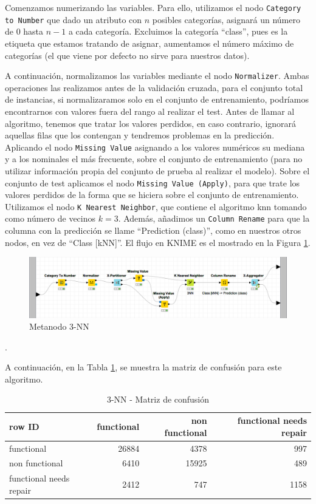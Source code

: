 \documentclass[a4paper, 20pt]{article}
\begin{document}
Comenzamos numerizando las variables. Para ello, utilizamos el nodo \texttt{Category to Number} que dado un atributo con $n$ posibles categorías, asignará un número de 0 hasta $n-1$ a cada categoría. Excluimos la categoría ``class'', pues es la etiqueta que estamos tratando de asignar, aumentamos el número máximo de categorías (el que viene por defecto no sirve para nuestros datos).

A continuación, normalizamos las variables mediante el nodo \texttt{Normalizer}. Ambas operaciones las realizamos antes de la validación cruzada, para el conjunto total de instancias, si normalizaramos solo en el conjunto de entrenamiento, podríamos encontrarnos con valores fuera del rango al realizar el test. Antes de llamar al algoritmo, tenemos que tratar los valores perdidos, en caso contrario, ignorará aquellas filas que los contengan y tendremos problemas en la predicción. Aplicando el nodo \texttt{Missing Value} asignando a los valores numéricos su mediana y a los nominales el más frecuente, sobre el conjunto de entrenamiento (para no utilizar información propia del conjunto de prueba al realizar el modelo). Sobre el conjunto de test aplicamos el nodo \texttt{Missing Value (Apply)}, para que trate los valores perdidos de la forma que se hiciera sobre el conjunto de entrenamiento. Utilizamos el nodo \texttt{K Nearest Neighbor}, que contiene el algoritmo knn tomando como número de vecinos $k = 3$. Además, añadimos un \texttt{Column Rename} para que la columna con la predicción se llame ``Prediction (class)'', como en nuestros otros nodos, en vez de ``Class [kNN]''. El flujo en KNIME es el mostrado en la Figura \ref{fig:3nn}.

\begin{figure}[H]
    \centering
    \includegraphics[width=1\textwidth]{3nn}
    \caption{Metanodo 3-NN}
    \label{fig:3nn}
\end{figure}.

A continuación, en la Tabla \ref{tab:CM3nn}, se muestra la matriz de confusión para este algoritmo.

\begin{table}[H]
\centering
\caption{3-NN - Matriz de confusión}
\label{tab:CM3nn}
\begin{tabular}{lrrr}
\toprule
row ID & functional & non functional & functional needs repair\\ \midrule
functional & 26884 & 4378 & 997\\
non functional & 6410 & 15925 & 489\\
functional needs repair & 2412 & 747 & 1158\\
\bottomrule
\end{tabular}
\end{table}
\end{document}
